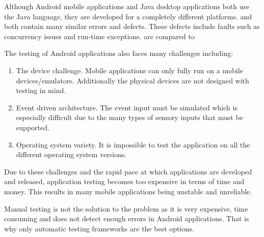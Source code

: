 \documentclass{acm_proc_article-sp}
\begin{document}

Although Android mobile applications and Java desktop applications both use the Java language, they are developed for a completely different
platforms.  and both contain many similar errors and defects. These defects include faults such as concurrency issues and run-time
exceptions. 
         are  compared to
         
         
The testing of Android applications  also faces many challenges including:
\begin{enumerate}
 \item The device challenge. 
 Mobile applications can only fully run on a mobile devices/emulators. Additionally the physical devices are
not designed with testing in mind.

 \item Event driven architecture.
 The event input must be simulated which is especially difficult due to the many types of
sensory inputs that must be supported. 

 \item Operating system variety. It is impossible to test the application on all the different operating system versions.
\end{enumerate}

Due to these challenges and the rapid pace at which applications are developed and released, application testing becomes too expensive in
terms of time and money. This results in many mobile applications being unstable and unreliable.

Manual testing is not the solution to the problem as it is very expensive, time consuming and does not detect enough errors in
Android applications. That is why only automatic testing frameworks are the best options.
\end{document}
